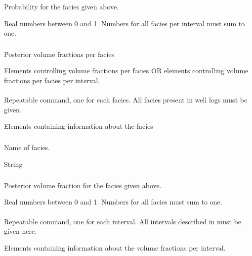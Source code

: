 {
 \slist
   \item \Description Probability for the facies given above.
   \item \Argument Real numbers between 0 and 1. Numbers for all facies per interval must sum to one.
   \item \Default
 \elist
 
\subsubsection{}
 \slist
   \item \Description Posterior volume fractions per facies
   \item \Argument Elements controlling volume fractions per facies OR elements controlling volume fractions per facies per interval.
   \item \Default
 \elist

\paragraph{}
 \slist
   \item \Description Repeatable command, one for each facies. All facies present in well logs must be given.
   \item \Argument Elements containing information about the facies
   \item \Default
 \elist

\subparagraph{}
 \slist
   \item \Description Name of facies.
   \item \Argument String
   \item \Default
 \elist

\subparagraph{}
 \slist
   \item \Description Posterior volume fraction for the facies given above.
   \item \Argument Real numbers between 0 and 1. Numbers for all facies must sum to one.
   \item \Default
 \elist

\paragraph{}
 \slist
   \item \Description Repeatable command, one for each interval. All intervals described in  must be given here.
   \item \Argument Elements containing information about the volume fractions per interval.
   \item \Default
 \elist
 
}
